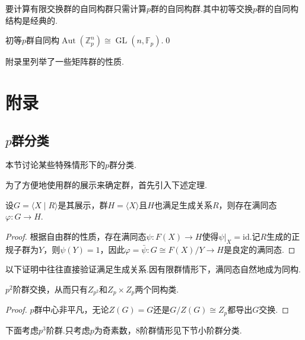要计算有限交换群的自同构群只需计算$p$群的自同构群.其中初等交换$p$群的自同构结构是经典的.
\begin{prop}
	初等$p$群自同构$\operatorname*{Aut}(\mathbb{Z}_p^n)\cong\operatorname*{GL}(n,\mathbb{F}_p)$.\qed
\end{prop}
\begin{remark}
	附录里列举了一些矩阵群的性质.
\end{remark}

\section{附录}
\subsection{\texorpdfstring{$p$群分类}{p群分类}}
本节讨论某些特殊情形下的$p$群分类.

为了方便地使用群的展示来确定群，首先引入下述定理.
\begin{thm}
	设$G=\langle X\mid R\rangle $是其展示，群$H=\langle X\rangle $且$H$也满足生成关系$R$，则存在满同态$\varphi\colon G\to H$.
\end{thm}
\begin{proof}
	根据自由群的性质，存在满同态$\psi\colon F(X)\to H$使得$\psi|_X=\mathrm{id}$.记$R$生成的正规子群为$Y$，则$\psi(Y)=1$，因此$\varphi=\bar\psi\colon G\cong F(X)/Y\to H$是良定的满同态.
\end{proof}
\begin{remark}
	以下证明中往往直接验证满足生成关系.因有限群情形下，满同态自然地成为同构.
\end{remark}

\begin{prop}
	$p^2$阶群交换，从而只有$Z_{p^2}$和$Z_p\times Z_p$两个同构类.
\end{prop}
\begin{proof}
	$p$群中心非平凡，无论$Z(G)=G$还是$G/Z(G)\cong Z_p$都导出$G$交换.
\end{proof}

下面考虑$p^3$阶群.只考虑$p$为奇素数，$8$阶群情形见下节小阶群分类.%

